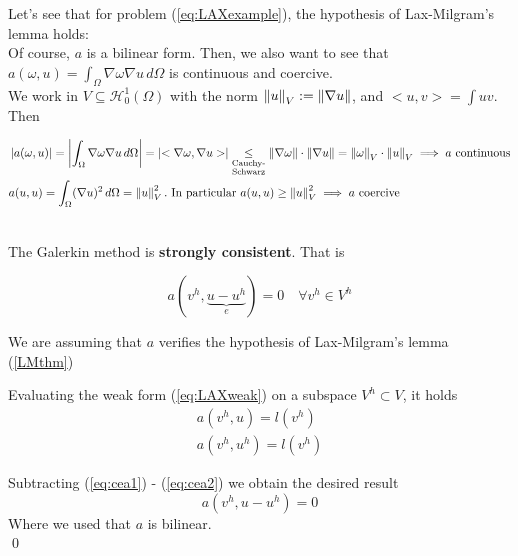 \newpage

\begin{example}
  Let's see that for problem (\ref{eq:LAXexample}), the hypothesis of Lax-Milgram's lemma holds: \\
  
  Of course, $a$ is a bilinear form. Then, we also want to see that $a(\omega,u) = \displaystyle{\int_{\Omega}}\nabla \omega \nabla u \, d\Omega$ is continuous and coercive.\\
  
  We work in $V\subseteq \mathcal{H}_0^1(\Omega)$ with the norm $\left\lVert u\right\rVert_V := \left\lVert\nabla u\right\rVert$, and $<u,v> = \displaystyle{\int} uv$. Then
  
\begin{align*}
    &\left\vert a(\omega, u) \right\vert = \left\vert \int_{\Omega}\nabla \omega \nabla u \, d\Omega \right\vert = \left\vert <\nabla\omega,\nabla u> \right\vert \underset{\substack{\text{Cauchy-}\\\text{Schwarz}}}{\leq} \left\lVert\nabla\omega\right\rVert\cdot\left\lVert\nabla u\right\rVert = \left\lVert\omega\right\rVert_V\cdot\left\lVert u\right\rVert_V \implies a \text{ continuous}\\
    &a(u,u) = \int_{\Omega} (\nabla u)^2 \, d\Omega = \left\lVert u\right\rVert_V^2. \text{ In particular } a(u,u) \geq \left\lVert u\right\rVert_V^2 \implies a \text{ coercive}
\end{align*}
  
\end{example}


\begin{lemma}[Céa]\-\\
  The Galerkin method is \textbf{strongly consistent}. That is
  
  \[
    a(v^h, \underbrace{u-u^h}_e) = 0 \quad \forall v^h \in V^h
  \]
\end{lemma}

\begin{remark}
  We are assuming that $a$ verifies the hypothesis of Lax-Milgram's lemma (\ref{LMthm})
\end{remark}



\begin{demo}
  Evaluating the weak form (\ref{eq:LAXweak}) on a subspace $V^h \subset V$, it holds
  \begin{align}
      a(v^h,u) = l(v^h)\label{eq:cea1}\\ 
      a(v^h,u^h) = l(v^h) \label{eq:cea2}
  \end{align}
  
  Subtracting (\ref{eq:cea1}) - (\ref{eq:cea2}) we obtain the desired result
  \[
    a(v^h, u-u^h) = 0
  \]
  Where we used that $a$ is bilinear. \\\qed
\end{demo}

